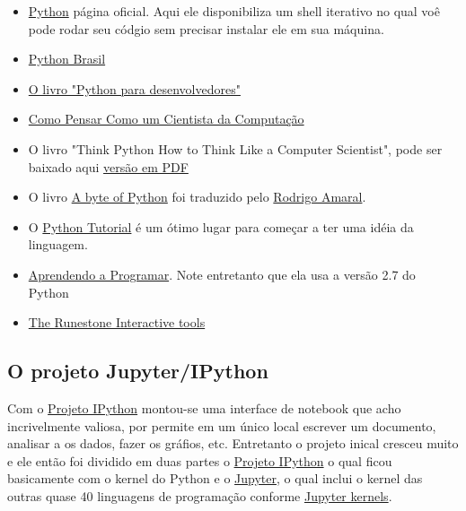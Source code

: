 \documentclass[11pt]{article}
\providecommand{\tightlist}{%
      \setlength{\itemsep}{0pt}\setlength{\parskip}{0pt}}
\begin{document}
\begin{itemize}
\tightlist
\item
  \href{https://www.python.org/}{Python} página oficial. Aqui ele
  disponibiliza um shell iterativo no qual voê pode rodar seu códgio sem
  precisar instalar ele em sua máquina.
\item
  \href{http://wiki.python.org.br/PythonBrasil}{Python Brasil}
\item
  \href{https://ark4n.wordpress.com/}{O livro "Python para
  desenvolvedores"}
\item
  \href{https://panda.ime.usp.br/pensepy/static/pensepy/index.html}{Como
  Pensar Como um Cientista da Computação}
\item
  O livro "Think Python How to Think Like a Computer Scientist", pode
  ser baixado aqui
  \href{http://www.greenteapress.com/thinkpython/thinkpython.pdf}{versão
  em PDF}
\item
  O livro
  \href{https://www.gitbook.com/book/swaroopch/byte-of-python/details}{A
  byte of Python} foi traduzido pelo
  \href{https://ramaral.wordpress.com/2012/08/05/e-book-do-livro-a-byte-of-python-em-portugues/}{Rodrigo
  Amaral}.
\item
  O \href{http://docs.python.org/3/tutorial/}{Python Tutorial} é um
  ótimo lugar para começar a ter uma idéia da linguagem.
\item
  \href{http://www.alan-g.me.uk/tutor/port/}{Aprendendo a Programar}.
  Note entretanto que ela usa a versão 2.7 do Python
\item
  \href{http://runestoneinteractive.org/library.html}{The Runestone
  Interactive tools}
\end{itemize}

\subsection{O projeto Jupyter/IPython}\label{o-projeto-jupyteripython}

Com o \href{http://ipython.org}{Projeto IPython} montou-se uma interface
de notebook que acho incrivelmente valiosa, por permite em um único
local escrever um documento, analisar a os dados, fazer os gráfios, etc.
Entretanto o projeto inical cresceu muito e ele então foi dividido em
duas partes o \href{http://ipython.org}{Projeto IPython} o qual ficou
basicamente com o kernel do Python e o
\href{https://jupyter.org/}{Jupyter}, o qual inclui o kernel das outras
quase 40 linguagens de programação conforme
\href{https://github.com/jupyter/jupyter/wiki/Jupyter-kernels}{Jupyter
kernels}.
\end{document}
